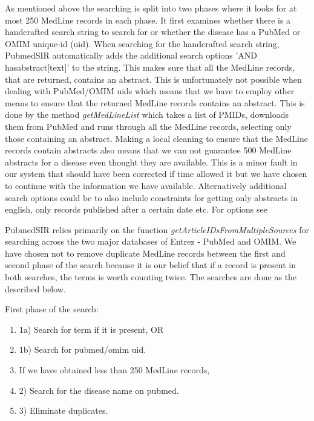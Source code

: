 As mentioned above the searching is split into two phases where it looks for at most 250 MedLine records in each phase. It first examines whether there is a handcrafted search string to search for or whether the disease has a PubMed or OMIM unique-id (uid). When searching for the handcrafted search string, PubmedSIR automatically adds the additional search options 'AND hasabstract[text]' to the string. This makes sure that all the MedLine records, that are returned, contains an abstract. This is unfortunately not possible when dealing with PubMed/OMIM uids which means that we have to employ other means to ensure that the returned MedLine records contains an abstract. This is done by the method \textit{getMedLineList} which takes a list of PMIDs, downloads them from PubMed and runs through all the MedLine records, selecting only those containing an abstract. Making a local cleaning to ensure that the MedLine records contain abstracts also means that we can not guarantee 500 MedLine abstracts for a disease even thought they are available. This is a minor fault in our system that should have been corrected if time allowed it but we have chosen to continue with the information we have available. Alternatively additional search options could be to also include constraints for getting only abstracts in english, only records published after a certain date etc. For options see \cite{PubmedHelpSearch}

PubmedSIR relies primarily on the function \textit{getArticleIDsFromMultipleSources} for searching across the two major databases of Entrez - PubMed and OMIM. We have chosen not to remove duplicate MedLine records between the first and second phase of the search because it is our belief that if a record is present in both searches, the terms is worth counting twice. The searches are done as the described below.

First phase of the search:

\begin{enumerate}

\item 1a) Search for term if it is present, OR

\item 1b) Search for pubmed/omim uid.

\item If we have obtained less than 250 MedLine records,

\item 2) Search for the disease name on pubmed.

\item 3) Eliminate duplicates.

\end{enumerate}

